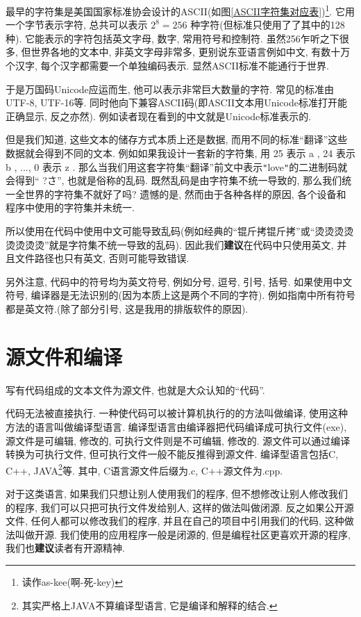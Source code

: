         最早的字符集是美国国家标准协会设计的ASCII(如图\ref{ASCII字符集对应表})\footnote{读作as-kee(啊-死-key)}. 它用一个字节表示字符, 总共可以表示 $ 2 ^ 8 = 256 $ 种字符(但标准只使用了了其中的128种). 它能表示的字符包括英文字母, 数字, 常用符号和控制符. 虽然256乍听之下很多, 但世界各地的文本中, 非英文字母非常多, 更别说东亚语言例如中文, 有数十万个汉字, 每个汉字都需要一个单独编码表示. 显然ASCII标准不能通行于世界.

        于是万国码Unicode应运而生, 他可以表示非常巨大数量的字符. 常见的标准由UTF-8, UTF-16等. 同时他向下兼容ASCII码(即ASCII文本用Unicode标准打开能正确显示, 反之亦然). 例如读者现在看到的中文就是Unicode标准表示的.

        但是我们知道, 这些文本的储存方式本质上还是数据, 而用不同的标准``翻译''这些数据就会得到不同的文本. 例如如果我设计一套新的字符集, 用 25 表示 a , 24 表示 b , ..., 0 表示 z . 那么当我们用这套字符集``翻译''前文中表示\texttt{"}love\texttt{"}的二进制码就会得到`` ?\makebox[0pt][r]{$ \ \square$}さ'', 也就是俗称的乱码. 既然乱码是由字符集不统一导致的, 那么我们统一全世界的字符集不就好了吗? 遗憾的是, 然而由于各种各样的原因, 各个设备和程序中使用的字符集并未统一.
        
        所以使用在代码中使用中文可能导致乱码(例如经典的``锟斤拷锟斤拷''或``烫烫烫烫烫烫烫烫''就是字符集不统一导致的乱码). 因此我们\textbf{建议}在代码中只使用英文, 并且文件路径也只有英文, 否则可能导致错误.

        另外注意, 代码中的符号均为英文符号, 例如分号, 逗号, 引号, 括号. 如果使用中文符号, 编译器是无法识别的(因为本质上这是两个不同的字符). 例如指南中所有符号都是英文符.(除了部分引号, 这是我用的排版软件的原因).
        
    \section{源文件和编译}
        写有代码组成的文本文件为源文件, 也就是大众认知的``代码''. 
        
        代码无法被直接执行. 一种使代码可以被计算机执行的的方法叫做编译, 使用这种方法的语言叫做编译型语言. 编译型语言由编译器把代码编译成可执行文件(exe), 源文件是可编辑, 修改的, 可执行文件则是不可编辑, 修改的. 源文件可以通过编译转换为可执行文件, 但可执行文件一般不能反推得到源文件. 编译型语言包括C, C++, JAVA\footnote{其实严格上JAVA不算编译型语言, 它是编译和解释的结合.}等. 其中, C语言源文件后缀为.c, C++源文件为.cpp.
        
        对于这类语言, 如果我们只想让别人使用我们的程序, 但不想修改让别人修改我们的程序, 我们可以只把可执行文件发给别人, 这样的做法叫做闭源. 反之如果公开源文件, 任何人都可以修改我们的程序, 并且在自己的项目中引用我们的代码, 这种做法叫做开源. 我们使用的应用程序一般是闭源的, 但是编程社区更喜欢开源的程序, 我们也\textbf{建议}读者有开源精神.

